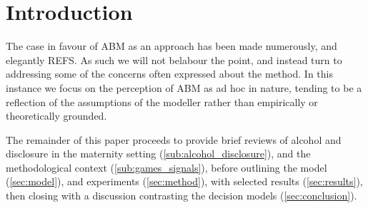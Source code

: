 \section{Introduction}
\label{sec:intro}

The case in favour of \ac{ABM} as an approach has been made numerously, and elegantly REFS. As such we will not belabour the point, and instead turn to addressing some of the concerns often expressed about the method. In this instance we focus on the perception of \ac{ABM} as ad hoc in nature, tending to be a reflection of the assumptions of the modeller rather than empirically or theoretically grounded.


The remainder of this paper proceeds to provide brief reviews of alcohol and disclosure in the maternity setting (\ref{sub:alcohol_disclosure}), and the methodological context (\ref{sub:games_signals}), before outlining the model (\ref{sec:model}), and experiments (\ref{sec:method}), with selected results (\ref{sec:results}), then closing with a discussion contrasting the decision models (\ref{sec:conclusion}).